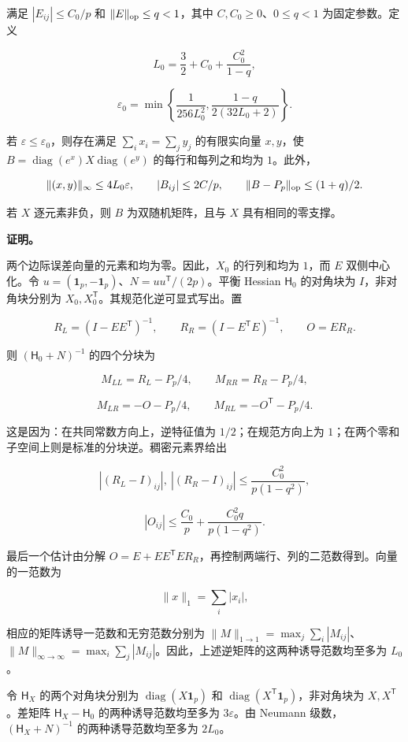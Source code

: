 \documentclass[11pt,a4paper]{article}
\begin{document}
满足 \(|E_{ij}|\le C_0/p\) 和 \(\|E\|_{\rm op}\le q<1\)，其中 \(C,C_0\ge0\)、\(0\le q<1\) 为固定参数。定义

\[L_0=\frac32+C_0+\frac{C_0^2}{1-q},\]

\[\varepsilon_0=\min\left\{\frac1{256L_0^2},\frac{1-q}{2(32L_0+2)}\right\}.\]

若 \(\varepsilon\le\varepsilon_0\)，则存在满足 \(\sum_i x_i=\sum_j y_j\) 的有限实向量 \(x,y\)，使 \(B=\operatorname{diag}(e^x)X\operatorname{diag}(e^y)\) 的每行和每列之和均为 \(1\)。此外，

\[\|(x,y)\|_\infty\le4L_0\varepsilon,\qquad |B_{ij}|\le2C/p,\qquad \|B-P_p\|_{\rm op}\le(1+q)/2.\]

若 \(X\) 逐元素非负，则 \(B\) 为双随机矩阵，且与 \(X\) 具有相同的零支撑。

\textbf{证明。}

两个边际误差向量的元素和均为零。因此，\(X_0\) 的行列和均为 \(1\)，而 \(E\) 双侧中心化。令 \(u=(\mathbf 1_p,-\mathbf 1_p)\)、\(N=uu^{\mathsf T}/(2p)\)。平衡 Hessian \(\mathsf H_0\) 的对角块为 \(I\)，非对角块分别为 \(X_0,X_0^{\mathsf T}\)。其规范化逆可显式写出。置

\[R_L=(I-EE^{\mathsf T})^{-1},\qquad R_R=(I-E^{\mathsf T}E)^{-1},\qquad O=ER_R.\]

则 \((\mathsf H_0+N)^{-1}\) 的四个分块为

\[M_{LL}=R_L-P_p/4,\qquad M_{RR}=R_R-P_p/4,\]

\[M_{LR}=-O-P_p/4,\qquad M_{RL}=-O^{\mathsf T}-P_p/4.\]

这是因为：在共同常数方向上，逆特征值为 \(1/2\)；在规范方向上为 \(1\)；在两个零和子空间上则是标准的分块逆。稠密元素界给出

\[|(R_L-I)_{ij}|,\ |(R_R-I)_{ij}|\le\frac{C_0^2}{p(1-q^2)},\]

\[|O_{ij}|\le\frac{C_0}{p}+\frac{C_0^2q}{p(1-q^2)}.\]

最后一个估计由分解 \(O=E+EE^{\mathsf T}ER_R\)，再控制两端行、列的二范数得到。向量的一范数为

\[\|x\|_1=\sum_i|x_i|,\]

相应的矩阵诱导一范数和无穷范数分别为 \(\|M\|_{1\to1}=\max_j\sum_i|M_{ij}|\)、\(\|M\|_{\infty\to\infty}=\max_i\sum_j|M_{ij}|\)。因此，上述逆矩阵的这两种诱导范数均至多为 \(L_0\)。

令 \(\mathsf H_X\) 的两个对角块分别为 \(\operatorname{diag}(X\mathbf 1_p)\) 和 \(\operatorname{diag}(X^{\mathsf T}\mathbf 1_p)\)，非对角块为 \(X,X^{\mathsf T}\)。差矩阵 \(\mathsf H_X-\mathsf H_0\) 的两种诱导范数均至多为 \(3\varepsilon\)。由 Neumann 级数，\((\mathsf H_X+N)^{-1}\) 的两种诱导范数均至多为 \(2L_0\)。
\end{document}
